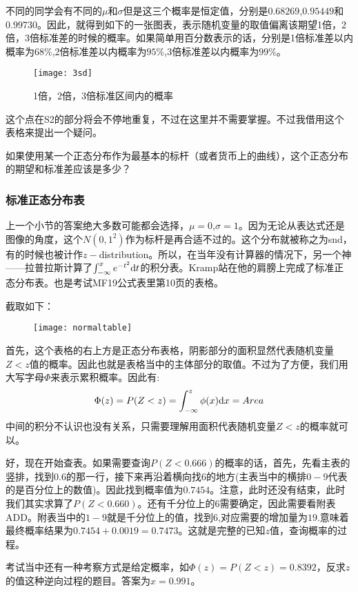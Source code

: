 不同的同学会有不同的$\mu$和$\sigma$但是这三个概率是恒定值，分别是$0.68269$,$0.95449$和$0.99730$。因此，就得到如下的一张图表，表示随机变量的取值偏离该期望1倍，2倍，3倍标准差的时候的概率。如果简单用百分数表示的话，分别是1倍标准差以内概率为$68\%$,2倍标准差以内概率为$95\%$,3倍标准差以内概率为$99\%$。

\begin{figure}[H]
\centering
\texttt{[image: 3sd]}
\caption{1倍，2倍，3倍标准区间内的概率}
\end{figure}

这个点在S2的部分将会不停地重复，不过在这里并不需要掌握。不过我借用这个表格来提出一个疑问。

如果使用某一个正态分布作为最基本的标杆（或者货币上的曲线），这个正态分布的期望和标准差应该是多少？

\subsubsection*{标准正态分布表}
上一个小节的答案绝大多数可能都会选择，$\mu=0$,$\sigma=1$。因为无论从表达式还是图像的角度，这个$N(0,1^2)$作为标杆是再合适不过的。这个分布就被称之为\gls{snd}，有的时候也被计作$z-$distribution。所以，在当年没有计算器的情况下，另一个神——拉普拉斯计算了$\int_{-\infty}^x e^{-t^2} {\mathrm{d}} t$的积分表。Kramp站在他的肩膀上完成了标准正态分布表。也是考试MF19公式表里第10页的表格。

截取如下：
\begin{figure}[H]
\centering
\texttt{[image: normaltable]}
\end{figure}

首先，这个表格的右上方是正态分布表格，阴影部分的面积显然代表随机变量$Z<z$值的概率。因此也就是表格当中的主体部分的取值。不过为了方便，我们用大写字母$\Phi$来表示累积概率。因此有:
\[
	\Phi(z)=P(Z<z)=\int_{-\infty}^{z} \phi(x) {\mathrm{d}} x = Area
\]
中间的积分不认识也没有关系，只需要理解用面积代表随机变量$Z<z$的概率就可以。

好，现在开始查表。如果需要查询$P(Z<0.666)$的概率的话，首先，先看主表的竖排，找到$0.6$的那一行，接下来再沿着横向找$6$的地方(主表当中的横排$0-9$代表的是百分位上的数值)。因此找到概率值为$0.7454$。注意，此时还没有结束，此时我们其实求算了$P(Z<0.660)$。还有千分位上的$6$需要确定，因此需要看附表ADD。附表当中的$1-9$就是千分位上的值，找到$6$,对应需要的增加量为$19$.意味着最终概率结果为$0.7454+0.0019=0.7473$。这就是完整的已知$z$值，查询概率的过程。

考试当中还有一种考察方式是给定概率，如$\Phi(z)=P(Z<z)=0.8392$，反求$z$的值这种逆向过程的题目。答案为$x=0.991$。

